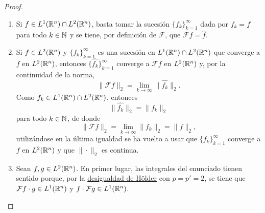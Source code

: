 \documentclass[a4paper, 11pt, oneside]{report}
\begin{document}
\begin{proof}
  \begin{enumerate}
    \item Si $f\in L^1(\mathbb R^n) \cap L^2(\mathbb R^n)$, basta tomar la sucesión $\{f_k\}_{k=1}^\infty$ dada por $f_k = f $ para todo $k \in \mathbb N$ y se tiene, por definición de $\mathcal{F}$, que $\mathcal{F}f = \widehat{f}$.
    \item Si $f \in L^2(\mathbb R^n)$ y $\{f_k\}_{k=1}^\infty$ es una sucesión en $L^1(\mathbb R^n) \cap L^2(\mathbb R^n)$ que converge a $f$ en $L^2(\mathbb R^n)$, entonces $\{\widehat{f_k}\}_{k=1}^\infty$ converge a $\mathcal{F}f$ en $L^2(\mathbb R^n)$ y, por la continuidad de la norma,
    \[\|\mathcal{F}f\|_2 = \lim_{k \to \infty} \|\widehat{f_k}\|_2.\]
    Como $f_k \in L ^1(\mathbb R^n) \cap L^2(\mathbb R^n)$, entonces \[\|\widehat{f_k}\|_2 = \|f_k\|_2\] para todo $k \in \mathbb N$, de donde
    \[\|\mathcal{F}f\|_2 = \lim_{k \to \infty} \|f_k\|_2 = \|f\|_2,\]
    utilizándose en la última igualdad se ha vuelto a usar que $\{f_k\}_{k=1}^\infty$ converge a $f$ en $L^2(\mathbb R^n)$ y que $\|\cdot\|_2$ es continua.
    \item Sean $f,g \in L^2(\mathbb R^n)$. En primer lugar, las integrales del enunciado tienen sentido porque, por la \hyperref[cor:1.4.4]{\color{c1}desigualdad de Hölder} con $p = p' =2$, se tiene que $\mathcal{F}f \cdot g\in L^1(\mathbb R^n)$ y $f \cdot \mathcal{F}g \in L^1(\mathbb R^n)$. 
    

\end{enumerate}
\end{proof}
\end{document}
